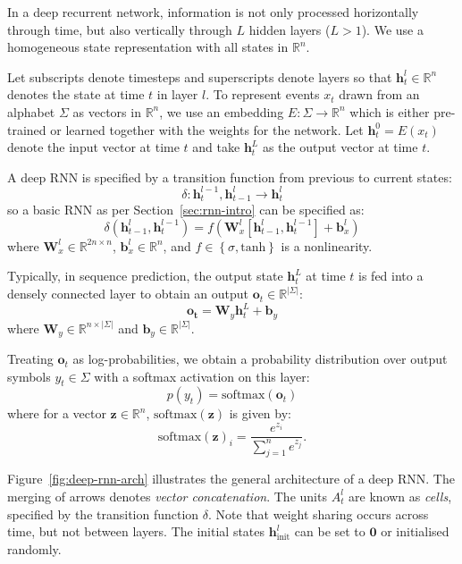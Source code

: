 \documentclass[12pt,a4paper,twoside,openright]{report}
\newcommand{\sref}[1]{Section~\ref{#1}}
\newcommand{\set}[1]{ \left\{ #1 \right\} }
\newcommand{\vect}[1]{\boldsymbol{\mathbf{#1}}}
\begin{document}
In a deep recurrent network, information is not only processed horizontally
through time, but also vertically through $L$ hidden layers ($L > 1$). We use a
homogeneous state representation with all states in $\mathbb{R}^n$.

Let subscripts denote timesteps and superscripts denote layers so that
$\vect{h}_t^l \in \mathbb{R}^n$ denotes the state at time $t$ in layer $l$. To
represent events $x_t$ drawn from an alphabet $\Sigma$ as vectors in
$\mathbb{R}^n$, we use an embedding $E : \Sigma \rightarrow \mathbb{R}^n$ which
is either pre-trained or learned together with the weights for the network. Let
$\vect{h}_t^0 = E(x_t)$ denote the input vector at time $t$ and take
$\vect{h}_t^L$ as the output vector at time $t$.

A deep RNN is specified by a transition function from previous to current
states:
$$ \delta : \vect{h}_t^{l-1}, \vect{h}_{t-1}^l \rightarrow \vect{h}_t^l $$
so a basic RNN as per \sref{sec:rnn-intro} can be specified as:
$$ \delta(\vect{h}_{t-1}^l, \vect{h}_t^{l-1}) = f(\vect{W}^l_x [\vect{h}_{t-1}^l,
\vect{h}_t^{l-1}] + \vect{b}^l_x) $$
where $\vect{W}^l_x \in \mathbb{R}^{2n \times n}$, $\vect{b}^l_x \in
\mathbb{R}^n$, and $f \in \set{ \sigma, \mathrm{tanh} }$ is a nonlinearity.

Typically, in sequence prediction, the output state $\vect{h}_t^L$ at time $t$
is fed into a densely connected layer to obtain an output $\vect{o}_t \in
\mathbb{R}^{|\Sigma|}$:
$$ \vect{o_t} = \vect{W}_y \vect{h}_t^L + \vect{b}_y $$
where $\vect{W}_y \in \mathbb{R}^{n \times |\Sigma|}$ and $\vect{b}_y \in
\mathbb{R}^{|\Sigma|}$. 

Treating $\vect{o}_t$ as log-probabilities, we obtain a probability distribution
over output symbols $y_t \in \Sigma$ with a softmax activation on this layer:
$$ p(y_t) = \mathrm{softmax}(\vect{o}_t) $$
where for a vector $\vect{z} \in \mathbb{R}^n$, $\mathrm{softmax}(\vect{z})$ is
given by:
$$ \mathrm{softmax}(\vect{z})_i = \frac{ e^{z_i} }{ \sum_{j = 1}^n e^{z_j} }. $$

Figure~\ref{fig:deep-rnn-arch} illustrates the general architecture of a deep
RNN. The merging of arrows denotes \emph{vector concatenation}. The units
$A_t^l$ are known as \emph{cells}, specified by the transition function
$\delta$.  Note that weight sharing occurs across time, but not between layers.
The initial states $\vect{h}_{\mathrm{init}}^l$ can be set to $\vect{0}$ or
initialised randomly.
\end{document}
